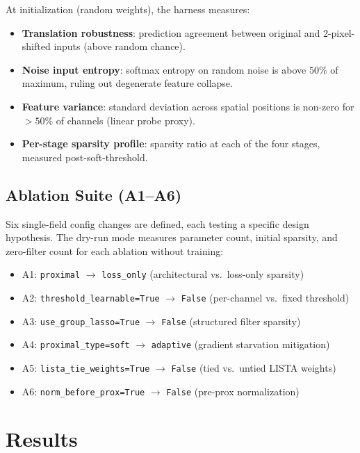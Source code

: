 \documentclass{article}
\begin{document}
At initialization (random weights), the harness measures:
\begin{itemize}
    \item \textbf{Translation robustness}: prediction agreement between
          original and 2-pixel-shifted inputs (above random chance).
    \item \textbf{Noise input entropy}: softmax entropy on random noise is
          above $50\%$ of maximum, ruling out degenerate feature collapse.
    \item \textbf{Feature variance}: standard deviation across spatial
          positions is non-zero for $>50\%$ of channels (linear probe proxy).
    \item \textbf{Per-stage sparsity profile}: sparsity ratio at each of the
          four stages, measured post-soft-threshold.
\end{itemize}

\subsection{Ablation Suite (A1--A6)}

Six single-field config changes are defined, each testing a specific design
hypothesis. The dry-run mode measures parameter count, initial sparsity, and
zero-filter count for each ablation without training:
\begin{itemize}
    \item A1: \texttt{proximal} $\to$ \texttt{loss\_only} (architectural vs.\
          loss-only sparsity)
    \item A2: \texttt{threshold\_learnable=True} $\to$ \texttt{False} (per-channel
          vs.\ fixed threshold)
    \item A3: \texttt{use\_group\_lasso=True} $\to$ \texttt{False} (structured
          filter sparsity)
    \item A4: \texttt{proximal\_type=soft} $\to$ \texttt{adaptive} (gradient
          starvation mitigation)
    \item A5: \texttt{lista\_tie\_weights=True} $\to$ \texttt{False} (tied vs.\
          untied LISTA weights)
    \item A6: \texttt{norm\_before\_prox=True} $\to$ \texttt{False} (pre-prox
          normalization)
\end{itemize}

\section{Results}
\label{sec:results}
\end{document}
